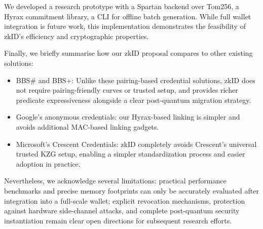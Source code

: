 We developed a research prototype with a Spartan backend over Tom256, a Hyrax commitment library, a CLI for offline batch generation. While full wallet integration is future work, this implementation demonstrates the feasibility of zkID’s efficiency and cryptographic properties.

Finally, we briefly summarise how our zkID proposal compares to other existing solutions:
\begin{itemize}
    \item BBS$\#$ and BBS+: Unlike these pairing-based credential solutions, zkID does not require pairing-friendly curves or trusted setup, and provides richer predicate expressiveness alongside a clear post-quantum migration strategy.
    \item Google’s anonymous credentials: our Hyrax-based linking is simpler and avoids additional MAC-based linking gadgets.
    \item Microsoft’s Crescent Credentials: zkID completely avoids Crescent’s universal trusted KZG setup, enabling a simpler standardization process and easier adoption in practice.
\end{itemize}

Nevertheless, we acknowledge several limitations: practical performance benchmarks and precise memory footprints can only be accurately evaluated after integration into a full-scale wallet; explicit revocation mechanisms, protection against hardware side-channel attacks, and complete post-quantum security instantiation remain clear open directions for subsequent research efforts.
